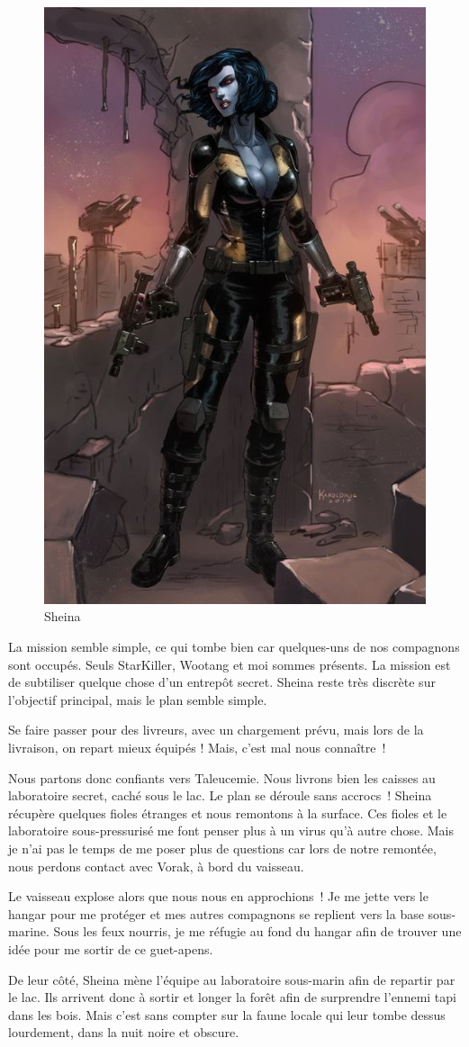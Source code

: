 \documentclass[a4paper,9pt,twoside,twocolumn,openany]{book}
\begin{document}
\begin{figure}
    \includegraphics[width=0.5\columnwidth]{img/sheina}
    \caption{Sheina}
\end{figure}

La mission semble simple, ce qui tombe bien car quelques-uns de nos compagnons sont occupés. Seuls StarKiller, Wootang et moi sommes présents. La mission est de subtiliser quelque chose d'un entrepôt secret. Sheina reste très discrète sur l'objectif principal, mais le plan semble simple.

Se faire passer pour des livreurs, avec un chargement prévu, mais lors de la livraison, on repart mieux équipés ! Mais, c'est mal nous connaître\ !

Nous partons donc confiants vers Taleucemie. Nous livrons bien les caisses au laboratoire secret, caché sous le lac. Le plan se déroule sans accrocs\ ! Sheina récupère quelques fioles étranges et nous remontons à la surface. Ces fioles et le laboratoire sous-pressurisé me font penser plus à un virus qu'à autre chose. Mais je n'ai pas le temps de me poser plus de questions car lors de notre remontée, nous perdons contact avec Vorak, à bord du vaisseau.

Le vaisseau explose alors que nous nous en approchions\ ! Je me jette vers le hangar pour me protéger et mes autres compagnons se replient vers la base sous-marine. Sous les feux nourris, je me réfugie au fond du hangar afin de trouver une idée pour me sortir de ce guet-apens.

De leur côté, Sheina mène l'équipe au laboratoire sous-marin afin de repartir par le lac. Ils arrivent donc à sortir et longer la forêt afin de surprendre l'ennemi tapi dans les bois. Mais c'est sans compter sur la faune locale qui leur tombe dessus lourdement, dans la nuit noire et obscure.
\end{document}
